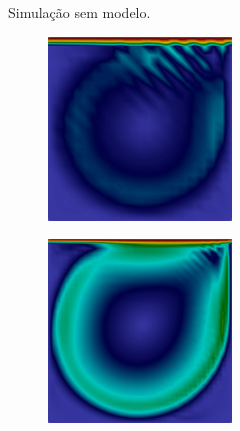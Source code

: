\begin{figure}[h!]
\begin{subfigure}{\textwidth}
\begin{subfigure}{\textwidth}
\begin{subfigure}{.32\textwidth}
            \end{subfigure}
            \caption{Simulação sem modelo.}
        \end{subfigure}
        \begin{subfigure}{\textwidth}\centering
            \begin{subfigure}{.32\textwidth}
                \includegraphics[width=\linewidth]{Figuras/cavity-poor/LES-Lin.png}
            \end{subfigure}
            \begin{subfigure}{.32\textwidth}
                \includegraphics[width=\linewidth]{Figuras/cavity-poor/LES-Qua.png}

\end{subfigure}
\end{subfigure}
\end{subfigure}
\end{figure}
